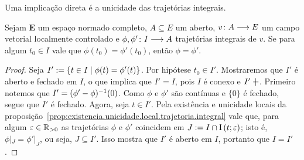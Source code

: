 Uma implicação direta é a unicidade das trajetórias integrais.

\begin{proposition}
\label{prop:unicidade.trajetoria.integral}
Sejam $\bm E$ um espaço normado completo, $A \subseteq E$ um aberto, $v\colon \allowbreak A \longrightarrow E$ um campo vetorial localmente controlado e $\phi, \phi'\colon \allowbreak I \longrightarrow A$ trajetórias integrais de $v$. Se para algum $t_0 \in I$ vale que $\phi(t_0) = \phi'(t_0)$, então $\phi = \phi'$.
\end{proposition}
\begin{proof}
Seja $I' := \left\{ t \in I \;\middle\vert\; \phi(t) = \phi'(t) \right\}$. Por hipótese $t_0 \in I'$. Mostraremos que $I'$ é aberto e fechado em $I$, o que implica que $I'=I$, pois $I$ é conexo e $I' \neq \empty$. Primeiro notemos que $I' = (\phi'-\phi)^{-1}(0)$. Como $\phi$ e $\phi'$ são contínuas e $\{0\}$ é fechado, segue que $I'$ é fechado. Agora, seja $t \in I'$. Pela existência e unicidade locais da proposição~\ref{prop:existencia.unicidade.local.trajetoria.integral} vale que, para algum $\varepsilon \in \mathbb{R}_{>0}$ as trajetórias $\phi$ e $\phi'$ coincidem em $J := I \cap \mathrm{I}\left(t; \varepsilon\right)$; isto é, $\phi|_J = \phi'|_J$, ou seja, $J \subseteq I'$. Isso mostra que $I'$ é aberto em $I$, portanto que $I = I'$.
\end{proof}


